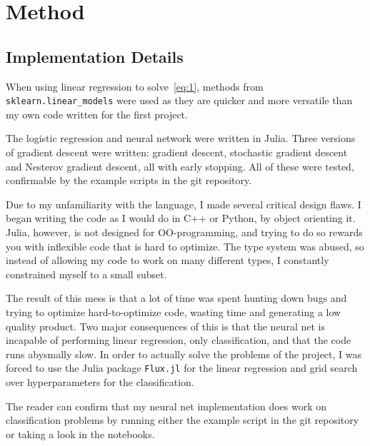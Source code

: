 \section{Method}\label{sec:Method}


\subsection{Implementation Details}

When using linear regression to solve~\eqref{eq:1}, methods from
\texttt{sklearn.linear\_models} were used as they are quicker and more versatile
than my own code written for the first project.

The logistic regression and neural network were written in Julia. Three versions
of gradient descent were written: gradient descent, stochastic gradient descent
and Nesterov gradient descent, all with early stopping. All of these
were tested, confirmable by the example scripts in the git repository.

Due to my
unfamiliarity with the language, I made several critical design flaws. I began
writing the code as I would do in C++ or Python, by object orienting it. Julia,
however, is not designed for OO-programming, and trying to do so rewards you with
inflexible code that is hard to optimize. The type system was abused, so
instead of allowing my code to work on many different types, I constantly
constrained myself to a small subset.

The result of this mess is that a lot of time was spent hunting down bugs and
trying to optimize hard-to-optimize code, wasting time and generating a low quality
product. Two major consequences of this is that the neural net is incapable of
performing linear regression, only classification, and that the code runs
abysmally slow. In order to actually solve the problems of the project, I was
forced to use the Julia package \texttt{Flux.jl} for the linear regression and
grid search over hyperparameters for the classification. 

The reader can confirm that my neural net implementation does work on
classification problems by running
either the example script in the git repository or taking a look in the
notebooks. 

